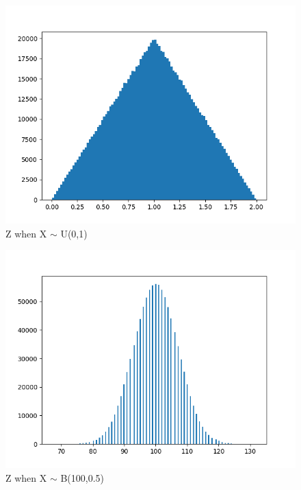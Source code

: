 \begin{figure}[!ht]
\centering
\includegraphics[width=\columnwidth]{solutions/2016/june/107/figures/uniform.png}
\caption{Z when X $\sim$ U(0,1)}
\label{june2016-107:fig:uniform}
\end{figure}
\begin{figure}[!ht]
\centering
\includegraphics[width=\columnwidth]{solutions/2016/june/107/figures/binom.png}
\caption{Z when X $\sim$ B(100,0.5)}
\label{june2016-107:fig:binomial}
\end{figure}

